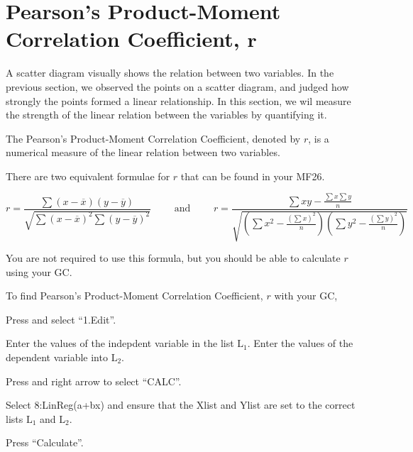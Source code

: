 \documentclass[11pt,a4paper]{book}
\begin{document}
\newpage

\section{Pearson's Product-Moment Correlation Coefficient, $\boldsymbol{r}$}

A scatter diagram visually shows the relation between two variables.
In the previous section, we observed the points on a scatter diagram,
and judged how strongly the points formed a linear relationship. In
this section, we wil measure the strength of the linear relation between
the variables by quantifying it.

The Pearson's Product-Moment Correlation Coefficient, denoted by $r$,
is a numerical measure of the linear relation between two variables.

There are two equivalent formulae for $r$ that can be found in your
MF26.

\[
r=\frac{\sum\left(x-\overline{x}\right)\left(y-\overline{y}\right)}{\sqrt{\sum\left(x-\overline{x}\right)^{2}\sum\left(y-\overline{y}\right)^{2}}}\qquad\text{ and }\qquad r=\frac{\sum xy-\frac{\sum x\sum y}{n}}{\sqrt{\left(\sum x^{2}-\frac{\left(\sum x\right)^{2}}{n}\right)\left(\sum y^{2}-\frac{\left(\sum y\right)^{2}}{n}\right)}}
\]

You are not required to use this formula, but you should be able to
calculate $r$ using your GC.

To find Pearson's Product-Moment Correlation Coefficient, $r$ with
your GC,

\begin{steps}[leftmargin=1.5cm]

\item  Press \tcbox[box align=base,nobeforeafter,colback=black, colframe=black,size=small]{\textbf{\textcolor{white}{stat}}}
and select ``1.Edit''.

\item  Enter the values of the indepdent variable in the list $\text{L}_{1}$.
Enter the values of the dependent variable into $\text{L}_{2}$.

\item  Press \tcbox[box align=base,nobeforeafter,colback=black, colframe=black,size=small]{\textbf{\textcolor{white}{stat}}}
and right arrow to select ``CALC''.

\item  Select 8:LinReg(a+bx) and ensure that the Xlist and Ylist
are set to the correct lists $\text{L}_{1}$ and $\text{L}_{2}$.

\item Press ``Calculate''.

\end{steps}
\end{document}
